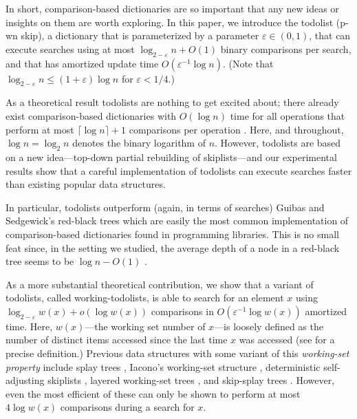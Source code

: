 \documentclass{patmorin}
\newcommand{\eps}{\varepsilon}
\begin{document}
In short, comparison-based dictionaries are so important that any
new ideas or insights on them are worth exploring.  In this paper,
we introduce the todolist (p-wn skip),
a dictionary that is parameterized by a parameter $\eps\in(0,1)$, 
that can execute searches using at most $\log_{2-\eps} n + O(1)$ binary
comparisons per search, and that has amortized update time $O(\eps^{-1}\log
n)$.  (Note that $\log_{2-\eps} n \le (1+\eps)\log n$ for $\eps < 1/4$.)

As a theoretical result todolists are nothing to get excited about; there
already exist comparison-based dictionaries with $O(\log n)$ time for all
operations that perform at most $\lceil\log n\rceil+1$ comparisons per
operation \cite{andersson.lai:fast,fagerberg:binary}. Here, and throughout,
$\log n=\log_2 n$ denotes the binary logarithm of $n$. However, todolists
are based on a new idea---top-down partial rebuilding of skiplists---and
our experimental results show that a careful implementation of todolists
can execute searches faster than existing popular data structures.

In particular, todolists outperform (again, in terms of searches) Guibas
and Sedgewick's red-black trees \cite{guibas.sedgewick:dichromatic} which are
easily the most common implementation of comparison-based dictionaries
found in programming libraries. This is no small feat since, in the
setting we studied, the average depth of a node in a red-black tree
seems to be $\log n - O(1)$ \cite{sedgewick:left-leaning}.

As a more substantial theoretical contribution, we show that a
variant of todolists, called working-todolists, is able to search for
an element $x$ using $\log_{2-\eps} w(x)+o(\log w(x))$ comparisons
in $O(\eps^{-1}\log w(x))$ amortized time.  Here, $w(x)$---the
working set number of $x$---is loosely defined as the number of
distinct items accessed since the last time $x$ was accessed (see
 for a precise definition.)  Previous data
structures with some variant of this \emph{working-set property}
include splay trees \cite{sleator.tarjan:self-adjusting}, Iacono's
working-set structure \cite{iacono:alternatives,badoiu.cole.ea:unified},
deterministic self-adjusting skiplists \cite{bose.douieb.ea:dynamic},
layered working-set trees \cite{bose.douieb.ea:layered}, and skip-splay
trees \cite{derryberry.sleator:skip-splay}.  However, even the most
efficient of these can only be shown to perform at most $4\log w(x)$
comparisons during a search for $x$.
\end{document}
